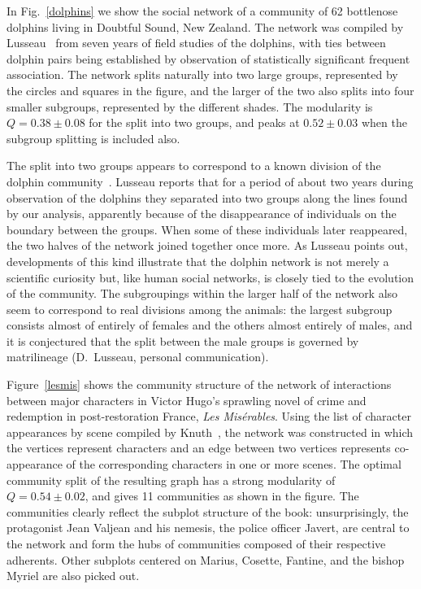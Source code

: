 \documentclass[twocolumn,pre,superscriptaddress]{revtex4}
\begin{document}
In Fig.~\ref{dolphins} we show the social network of a community of 62
bottlenose dolphins living in Doubtful Sound, New Zealand.  The network was
compiled by Lusseau~\cite{Lusseau03b} from seven years of field studies of
the dolphins, with ties between dolphin pairs being established by
observation of statistically significant frequent association.  The network
splits naturally into two large groups, represented by the circles and
squares in the figure, and the larger of the two also splits into four
smaller subgroups, represented by the different shades.  The modularity is
$Q=0.38\pm0.08$ for the split into two groups, and peaks at $0.52\pm0.03$
when the subgroup splitting is included also.

The split into two groups appears to correspond to a known division of the
dolphin community~\cite{Lusseau03a}.  Lusseau reports that for a period of
about two years during observation of the dolphins they separated into two
groups along the lines found by our analysis, apparently because of the
disappearance of individuals on the boundary between the groups.  When some
of these individuals later reappeared, the two halves of the network joined
together once more.  As Lusseau points out, developments of this kind
illustrate that the dolphin network is not merely a scientific curiosity
but, like human social networks, is closely tied to the evolution of the
community.  The subgroupings within the larger half of the network also
seem to correspond to real divisions among the animals: the largest
subgroup consists almost of entirely of females and the others almost
entirely of males, and it is conjectured that the split between the male
groups is governed by matrilineage (D.~Lusseau, personal communication).

Figure~\ref{lesmis} shows the community structure of the network of
interactions between major characters in Victor Hugo's sprawling novel of
crime and redemption in post-restoration France, \textit{Les Mis\'erables}.
Using the list of character appearances by scene compiled by
Knuth~\cite{Knuth93}, the network was constructed in which the vertices
represent characters and an edge between two vertices represents
co-appearance of the corresponding characters in one or more scenes.  The
optimal community split of the resulting graph has a strong modularity of
$Q=0.54\pm0.02$, and gives 11 communities as shown in the figure.  The
communities clearly reflect the subplot structure of the book:
unsurprisingly, the protagonist Jean Valjean and his nemesis, the police
officer Javert, are central to the network and form the hubs of communities
composed of their respective adherents.  Other subplots centered on Marius,
Cosette, Fantine, and the bishop Myriel are also picked out.
\end{document}
